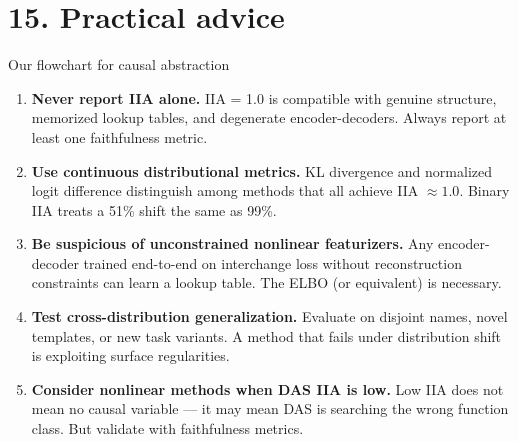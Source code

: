\documentclass[aspectratio=169,11pt]{beamer}
\begin{document}
\hypertarget{sec15}{}
\section{15. Practical advice}

\begin{frame}{Our flowchart for causal abstraction}
\vspace{-0.3em}

\begin{enumerate}\setlength{\itemsep}{2pt}
  \item {\scriptsize \textbf{Never report IIA alone.} IIA = 1.0 is compatible with genuine structure, memorized lookup tables, and degenerate encoder-decoders. Always report at least one faithfulness metric.}

  \item {\scriptsize \textbf{Use continuous distributional metrics.} KL divergence and normalized logit difference distinguish among methods that all achieve IIA $\approx 1.0$. Binary IIA treats a 51\% shift the same as 99\%.}

  \item {\scriptsize \textbf{Be suspicious of unconstrained nonlinear featurizers.} Any encoder-decoder trained end-to-end on interchange loss without reconstruction constraints can learn a lookup table. The ELBO (or equivalent) is necessary.}

  \item {\scriptsize \textbf{Test cross-distribution generalization.} Evaluate on disjoint names, novel templates, or new task variants. A method that fails under distribution shift is exploiting surface regularities.}

  \item {\scriptsize \textbf{Consider nonlinear methods when DAS IIA is low.} Low IIA does not mean no causal variable --- it may mean DAS is searching the wrong function class. But validate with faithfulness metrics.}
\end{enumerate}
\end{frame}
\end{document}
